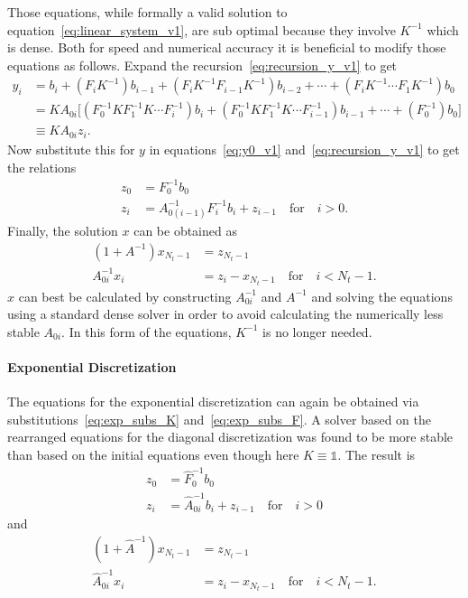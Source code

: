 \documentclass[a4paper, fleqn, twoside, notitlepage]{scrartcl}
\begin{document}
\noindent
Those equations, while formally a valid solution to equation~\eqref{eq:linear_system_v1}, are sub optimal because they involve $K^{-1}$ which is dense.
Both for speed and numerical accuracy it is beneficial to modify those equations as follows.
Expand the recursion~\eqref{eq:recursion_y_v1} to get
\begin{align}
  y_i &= b_i + (F_i K^{-1}) b_{i-1} + (F_{i} K^{-1} F_{i-1}K^{-1}) b_{i-2} + \cdots + (F_i K^{-1} \cdots F_1 K^{-1}) b_0\\
      &= K A_{0i} \big[(F_0^{-1} K F_1^{-1} K \cdots F_i^{-1}) b_i + (F_0^{-1} K F_1^{-1} K \cdots F_{i-1}^{-1}) b_{i-1} + \cdots + (F_0^{-1}) b_0\big]\\
  &\equiv K A_{0i} z_i.
\end{align}
Now substitute this for $y$ in equations~\eqref{eq:y0_v1} and~\eqref{eq:recursion_y_v1} to get the relations
\begin{align}
  z_0 &= F_0^{-1} b_0\\
  z_i &= A_{0(i-1)}^{-1} F_i^{-1} b_i + z_{i-1} \quad \text{for} \quad i > 0.
\end{align}
Finally, the solution $x$ can be obtained as
\begin{align}
  (1 + A^{-1}) x_{N_t-1} &= z_{N_t-1}\\
  A_{0i}^{-1} x_i &= z_i - x_{N_t-1} \quad \text{for} \quad i < N_t-1.
\end{align}
$x$ can best be calculated by constructing $A_{0i}^{-1}$ and $A^{-1}$ and solving the equations using a standard dense solver in order to avoid calculating the numerically less stable $A_{0i}$.
In this form of the equations, $K^{-1}$ is no longer needed.

\paragraph{Exponential Discretization}
The equations for the exponential discretization can again be obtained via substitutions~\eqref{eq:exp_subs_K} and~\eqref{eq:exp_subs_F}.
A solver based on the rearranged equations for the diagonal discretization was found to be more stable than based on the initial equations even though here $K \equiv \mathds{1}$.
The result is
\begin{align}
  z_0 &= \hat{F}_0^{-1} b_0\\
  z_i &= \hat{A}_{0i}^{-1} b_i + z_{i-1} \quad \text{for} \quad i > 0
\end{align}
and
\begin{align}
  (1 + \hat{A}^{-1}) x_{N_t-1} &= z_{N_t-1}\\
  \hat{A}_{0i}^{-1} x_i &= z_i - x_{N_t-1} \quad \text{for} \quad i < N_t-1.
\end{align}
\end{document}
